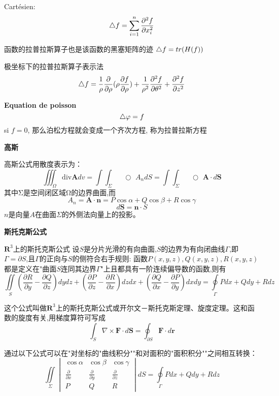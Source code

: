 \documentclass{book}
\begin{document}
Cart\'esien: $$\mathop{}\!\mathbin\bigtriangleup f = \sum_{i=1}^n \frac{\partial^2 f }{\partial x_i^2} $$

函数的拉普拉斯算子也是该函数的黑塞矩阵的迹 $\mathop{}\!\mathbin\bigtriangleup f = tr(H(f))$

极坐标下的拉普拉斯算子表示法
$$
\mathop{}\!\mathbin\bigtriangleup f
= \frac{1}{\rho}\frac{\partial}{\partial \rho}(\rho \frac{\partial f}{\partial \rho})
+ \frac{1}{\rho^2}\frac{\partial ^2 f}{\partial\theta^2}
+ \frac{\partial^2 f}{\partial z^2}
$$
\bigskip

\textbf{Equation de poisson}
$$\mathop{}\!\mathbin\bigtriangleup \varphi = f$$
si $f=0$, 那么泊松方程就会变成一个齐次方程, 称为拉普拉斯方程

\bigskip
\textbf{高斯}

高斯公式用散度表示为：
$$
\iiint_{\Omega}\mathrm{div}\mathbf{A}dv=
\int\!\!\!\!\int_{\Sigma}\!\!\!\!\!\!\!\!\!\!\!\!\!\!\;\;\;\bigcirc\,\,A_{n}dS
=
\int\!\!\!\!\int_{\Sigma}\!\!\!\!\!\!\!\!\!\!\!\!\!\!\;\;\;\bigcirc\,\,\mathbf{A}\cdot d\mathbf{S}
$$
其中Σ是空间闭区域Ω的边界曲面,而
$$ A_n=\mathbf{A}\cdot\mathbf{n}=P\cos\alpha+Q\cos\beta+R\cos\gamma $$
$$ d\mathbf{S}=\mathbf{n}\cdot S $$
$n$是向量$A$在曲面$\Sigma$的外侧法向量上的投影。

\bigskip
\textbf{斯托克斯公式}

$\mathbf{R}^3$上的斯托克斯公式
设$S$是分片光滑的有向曲面,$S$的边界为有向闭曲线$Γ$,即$\Gamma=\partial S$,且$Γ$的正向与$S$的侧符合右手规则:
函数$P(x,y,z),Q(x,y,z),R(x,y,z)$都是定义在"曲面$S$连同其边界$Γ$"上且都具有一阶连续偏导数的函数,则有
$$
\iint\limits_{S}(\frac{\partial R}{\partial y}-\frac{\partial Q}{\partial z})dydz
+ (\frac{\partial P}{\partial z}-\frac{\partial R}{\partial x})dzdx
+ (\frac{\partial Q}{\partial x}-\frac{\partial P}{\partial y})dxdy
= \oint\limits_{\Gamma}Pdx+Qdy+Rdz
$$

这个公式叫做$\mathbf{R}^3$上的斯托克斯公式或开尔文－斯托克斯定理、旋度定理。这和函数的旋度有关,用梯度算符可写成
$$ \int_{S} \nabla \times \mathbf{F} \cdot d\mathbf{S} = \oint_{\partial S} \mathbf{F} \cdot d \mathbf{r} $$

通过以下公式可以在"对坐标的"曲线积分""和对面积的"面积积分""之间相互转换：
$$
\iint\limits_{\Sigma}\begin{vmatrix} \cos \alpha & \cos \beta & \cos \gamma \\ \frac{\partial}{\partial x} & \frac{\partial}{\partial y} & \frac{\partial}{\partial z} \\ P & Q & R \end{vmatrix}dS=\oint\limits_{\Gamma}Pdx+Qdy+Rdz
$$
\end{document}
